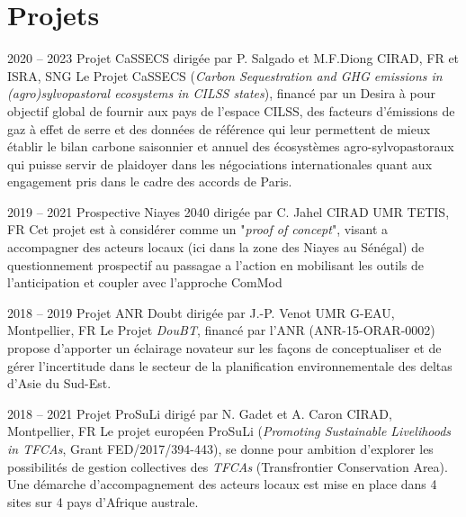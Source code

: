 \documentclass[]{cv-etienne}
\begin{document}
\section{Projets}
\begin{entrylist}
\entry
{2020 -- 2023}
{Projet CaSSECS {\normalfont dirigée par P. Salgado et M.F.Diong}}
{CIRAD, FR et ISRA, SNG}
{
Le Projet CaSSECS (\emph{Carbon Sequestration and GHG emissions in (agro)sylvopastoral ecosystems in CILSS states}), financé par un Desira à pour objectif global de fournir aux pays de l’espace CILSS, des facteurs d’émissions de gaz à effet de serre et des données de référence qui leur permettent de mieux établir le bilan carbone saisonnier et annuel des écosystèmes agro-sylvopastoraux qui puisse servir de plaidoyer dans les négociations internationales quant aux engagement pris dans le cadre des accords de Paris.
}
\end{entrylist}
\begin{entrylist}
\entry
{2019 -- 2021}
{Prospective Niayes 2040 {\normalfont dirigée par C. Jahel}}
{CIRAD UMR TETIS, FR}
{
Cet projet est à considérer comme un "\textit{proof of concept}", visant a accompagner des acteurs locaux (ici dans la zone des Niayes au Sénégal) de questionnement prospectif au passagae a l'action en mobilisant les outils de l'anticipation et coupler avec l'approche ComMod
}
\end{entrylist}
\begin{entrylist}
\entry
{2018 -- 2019}
{Projet ANR Doubt {\normalfont dirigée par J.-P. Venot}}
{UMR G-EAU, Montpellier, FR}
{
Le Projet \emph{DouBT}, financé par l'ANR (ANR-15-ORAR-0002) propose d'apporter un éclairage novateur sur les façons de conceptualiser et de gérer l'incertitude dans le secteur de la planification environnementale des deltas d'Asie du Sud-Est.
}
\end{entrylist}
\begin{entrylist}
\entry
{2018 -- 2021}
{Projet ProSuLi {\normalfont dirigé par N. Gadet et A. Caron}}
{CIRAD, Montpellier, FR}
{
Le projet européen ProSuLi (\emph{Promoting Sustainable Livelihoods in TFCAs}, Grant FED/2017/394-443), se donne pour ambition d'explorer les possibilités de gestion collectives des \emph{TFCAs} (Transfrontier Conservation Area). Une démarche d'accompagnement des acteurs locaux est mise en place dans 4 sites sur 4 pays d'Afrique australe.
}
\end{entrylist}
\end{document}
